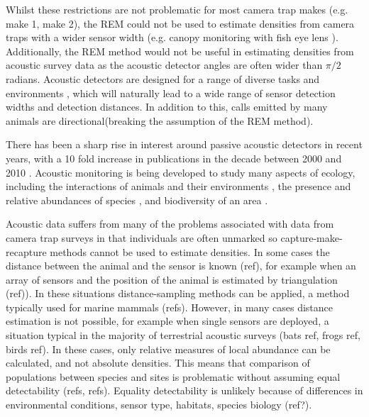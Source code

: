 Whilst these restrictions are not problematic for most camera trap makes (e.g. make 1, make 2), the REM could not be used to estimate densities from camera traps with a wider sensor width (e.g. canopy monitoring with fish eye lens \citep{brusa2014increasing}). Additionally, the REM method would not be useful in estimating densities from acoustic survey data as the acoustic detector angles are often wider than $\pi/2$ radians.  Acoustic detectors are designed for a range of diverse tasks and environments \citep{kessel2014review}, which will naturally lead to a wide range of sensor detection widths and detection distances. In addition to this, calls emitted by many animals are directional(breaking the assumption of the REM method). 

There has been a sharp rise in interest around passive acoustic detectors in recent years, with a 10 fold increase in publications in the decade between 2000 and 2010 \citep{kessel2014review}. Acoustic monitoring is being developed to study many aspects of ecology, including the interactions of animals and their environments \citep{blumstein2011acoustic, straight2014passive, marcoux2011local, rogers2013density}, the presence and relative abundances of species \citep{mckown2012wireless, marcoux2011local}, and biodiversity of an area \citep{ depraetere2012monitoring}. 

Acoustic data suffers from many of the problems associated with data from camera trap surveys in that individuals are often unmarked so capture-make-recapture methods cannot be used to estimate densities. In some cases the distance between the animal and the sensor is known (ref), for example when an array of sensors and the position of the animal is estimated by triangulation (ref)). In these situations distance-sampling methods can be applied, a method typically used for marine mammals (refs). However, in many cases distance estimation is not possible, for example when single sensors are deployed, a situation typical in the majority of terrestrial acoustic surveys (bats ref, frogs ref, birds ref). In these cases, only relative measures of local abundance can be calculated, and not absolute densities. This means that comparison of populations between species and sites is problematic without assuming equal detectability (refs, refs). Equality detectability is unlikely because of differences in environmental conditions, sensor type, habitats, species biology (ref?). 

